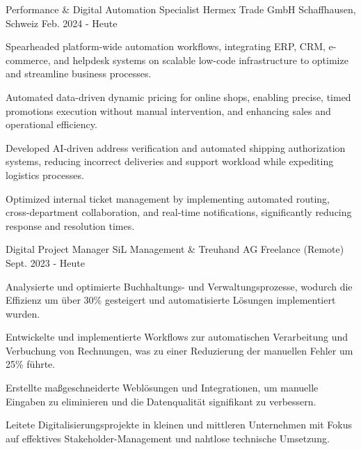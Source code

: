

\begin{cventries}
\cventry
  {Performance \& Digital Automation Specialist}
  {Hermex Trade GmbH}
  {Schaffhausen, Schweiz}
  {Feb. 2024 - Heute}
  {
    \begin{cvitems}
\item {Spearheaded platform-wide automation workflows, integrating ERP, CRM, e-commerce, and helpdesk systems on scalable low-code infrastructure to optimize and streamline business processes.}
\item {Automated data-driven dynamic pricing for online shops, enabling precise, timed promotions execution without manual intervention, and enhancing sales and operational efficiency.}
\item {Developed AI-driven address verification and automated shipping authorization systems, reducing incorrect deliveries and support workload while expediting logistics processes.}
\item {Optimized internal ticket management by implementing automated routing, cross-department collaboration, and real-time notifications, significantly reducing response and resolution times.}
\end{cvitems}
  }

\cventry
  {Digital Project Manager}
  {SiL Management \& Treuhand AG}
  {Freelance (Remote)}
  {Sept. 2023 - Heute}
  {
    \begin{cvitems}
\item {Analysierte und optimierte Buchhaltungs- und Verwaltungsprozesse, wodurch die Effizienz um über 30\% gesteigert und automatisierte Lösungen implementiert wurden.}
\item {Entwickelte und implementierte Workflows zur automatischen Verarbeitung und Verbuchung von Rechnungen, was zu einer Reduzierung der manuellen Fehler um 25\% führte.}
\item {Erstellte maßgeschneiderte Weblösungen und Integrationen, um manuelle Eingaben zu eliminieren und die Datenqualität signifikant zu verbessern.}
\item {Leitete Digitalisierungsprojekte in kleinen und mittleren Unternehmen mit Fokus auf effektives Stakeholder-Management und nahtlose technische Umsetzung.}
\end{cvitems}
  }


\end{cventries}
